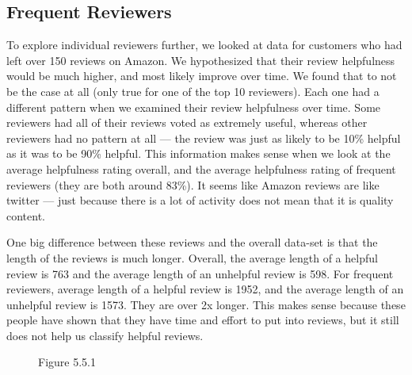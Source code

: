 \documentclass[11pt]{article}
\begin{document}
\subsection{Frequent Reviewers}

To explore individual reviewers further, we looked at data for customers who had left over 150 reviews on Amazon. We hypothesized that their review helpfulness would be much higher, and most likely improve over time. We found that to not be the case at all (only true for one of the top 10 reviewers). Each one had a different pattern when we examined their review helpfulness over time. Some reviewers had all of their reviews voted as extremely useful, whereas other reviewers had no pattern at all — the review was just as likely to be 10\% helpful as it was to be 90\% helpful. This information makes sense when we look at the average helpfulness rating overall, and the average helpfulness rating of frequent reviewers (they are both around 83\%). It seems like Amazon reviews are like twitter — just because there is a lot of activity does not mean that it is quality content. 

One big difference between these reviews and the overall data-set is that the length of the reviews is much longer. Overall, the average length of a helpful review is 763 and the average length of an unhelpful review is 598. For frequent reviewers, average length of a helpful review is 1952, and the average length of an unhelpful review is 1573. They are over 2x longer. This makes sense because these people have shown that they have time and effort to put into reviews, but it still does not help us classify helpful reviews.

\begin{figure}[!htb]
\begin{center}
Figure 5.5.1
\end{center}
\end{figure}
\end{document}
